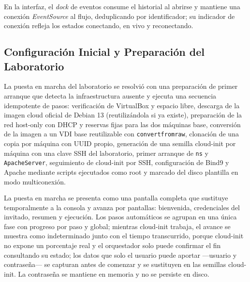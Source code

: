En la interfaz, el \textit{dock} de eventos consume el historial al abrirse y mantiene una conexión \textit{EventSource} al flujo, deduplicando por identificador; su indicador de conexión refleja los estados conectando, en vivo y reconectando.

\subsection{Configuración Inicial y Preparación del Laboratorio}
La puesta en marcha del laboratorio se resolvió con una preparación de primer arranque que detecta la infraestructura ausente y ejecuta una secuencia idempotente de pasos: verificación de VirtualBox y espacio libre, descarga de la imagen cloud oficial de Debian 13 (reutilizándola si ya existe), preparación de la red host-only con DHCP y reservas fijas para las dos máquinas base, conversión de la imagen a un VDI base reutilizable con \texttt{convertfromraw}, clonación de una copia por máquina con UUID propio, generación de una semilla cloud-init por máquina con una clave SSH del laboratorio, primer arranque de \texttt{ns} y \texttt{ApacheServer}, seguimiento de cloud-init por SSH, configuración de Bind9 y Apache mediante scripts ejecutados como root y marcado del disco plantilla en modo multiconexión.

La puesta en marcha se presenta como una pantalla completa que sustituye temporalmente a la consola y avanza por pantallas: bienvenida, credenciales del invitado, resumen y ejecución. Los pasos automáticos se agrupan en una única fase con progreso por paso y global; mientras cloud-init trabaja, el avance se muestra como indeterminado junto con el tiempo transcurrido, porque cloud-init no expone un porcentaje real y el orquestador solo puede confirmar el fin consultando su estado; los datos que solo el usuario puede aportar —usuario y contraseña— se capturan antes de comenzar y se sustituyen en las semillas cloud-init. La contraseña se mantiene en memoria y no se persiste en disco.

